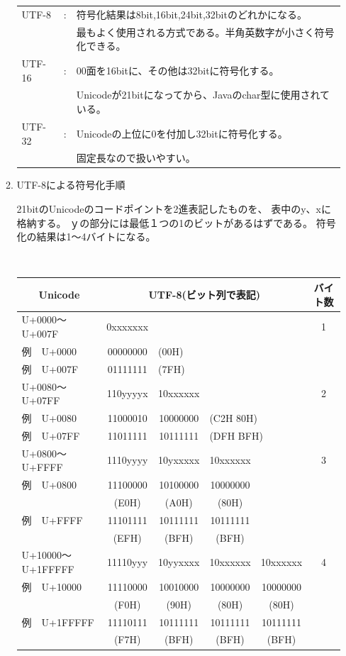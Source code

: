 \documentclass[a4j,dvipdfmx]{jarticle}
\begin{document}
\begin{enumerate}
\begin{enumerate}
\begin{tabular}{l c l }
UTF-8  & : & 符号化結果は8bit,16bit,24bit,32bitのどれかになる。\\
       &   & 最もよく使用される方式である。半角英数字が小さく符号化できる。\\
UTF-16 & : & 00面を16bitに、その他は32bitに符号化する。\\
       &   & Unicodeが21bitになってから、Javaのchar型に使用されている。\\
UTF-32 & : & Unicodeの上位に0を付加し32bitに符号化する。\\
       &   & 固定長なので扱いやすい。\\
\end{tabular}

\item UTF-8による符号化手順

21bitのUnicodeのコードポイントを2進表記したものを、
表中のy、xに格納する。
ｙの部分には最低１つの1のビットがあるはずである。
符号化の結果は1〜4バイトになる。

{\tt%
\begin{tabular}{|l|cccc|c|}
\hline
\multicolumn{1}{|c}{Unicode} &
\multicolumn{4}{|c}{UTF-8(ビット列で表記)} &
\multicolumn{1}{|c|}{バイト数} \\
\hline
U+0000〜U+007F    & 0xxxxxxx &          &          &          & 1 \\
例　U+0000        & 00000000 & \multicolumn{3}{l|}{(00H)}     &   \\
例　U+007F        & 01111111 & \multicolumn{3}{l|}{(7FH)}     &   \\
\hline
U+0080〜U+07FF    & 110yyyyx & 10xxxxxx &          &          & 2 \\
例　U+0080        & 11000010 & 10000000 & \multicolumn{2}{l|}{(C2H 80H)} & \\
例　U+07FF        & 11011111 & 10111111 & \multicolumn{2}{l|}{(DFH BFH)} & \\
\hline
U+0800〜U+FFFF    & 1110yyyy & 10yxxxxx & 10xxxxxx &          & 3 \\
例　U+0800        & 11100000 & 10100000 & 10000000 &          &   \\
                  & (E0H)    & (A0H)    & (80H)    &          &   \\
例　U+FFFF        & 11101111 & 10111111 & 10111111 &          &   \\
                  & (EFH)    & (BFH)    & (BFH)    &          &   \\
\hline
U+10000〜U+1FFFFF & 11110yyy & 10yyxxxx & 10xxxxxx & 10xxxxxx & 4 \\
例　U+10000       & 11110000 & 10010000 & 10000000 & 10000000 &   \\
　                & (F0H)    & (90H)    & (80H)    & (80H)    &   \\
例　U+1FFFFF      & 11110111 & 10111111 & 10111111 & 10111111 &   \\
                  & (F7H)    & (BFH)    & (BFH)    & (BFH)    &   \\
\hline
\end{tabular}}


\end{enumerate}
\end{enumerate}
\end{document}
